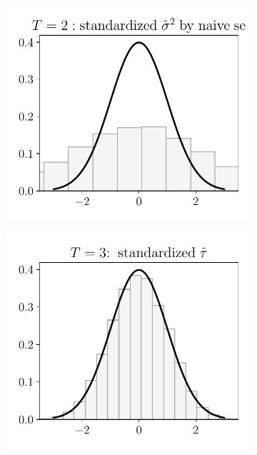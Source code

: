 \begin{figure}[h!]
\begin{subfigure}{0.3\textwidth}
	\end{subfigure}
	\begin{subfigure}{0.3\textwidth}
		\centering
		\includegraphics[width=1\linewidth]{plots/simulation/sigma_T_2_wrong.pdf}
	\end{subfigure}
	\begin{subfigure}{0.3\textwidth}
		\centering
		\includegraphics[width=1\linewidth]{plots/simulation/tau_T_3.pdf}

\end{subfigure}
\end{figure}
